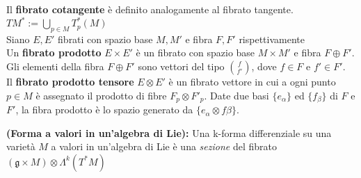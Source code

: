 Il \textbf{fibrato cotangente} è definito analogamente al fibrato tangente.
$ TM^* := \bigcup\limits_{p \in M} T^*_p(M) $\\

Siano $E,E'$ fibrati con spazio base $M,M'$ e fibra $F,F'$ rispettivamente\\

Un \textbf{fibrato prodotto} $E \times E'$ è un fibrato con spazio base
$M \times M'$ e fibra $F \oplus F'$. Gli elementi della fibra $F \oplus F'$ sono
vettori del tipo
${f}\choose{f'}$, dove  $f \in F$ e $f' \in F'$.\\

Il \textbf{fibrato prodotto tensore} $E \otimes E'$ è un fibrato vettore in cui
a ogni punto $p \in M$ è assegnato il prodotto di fibre $F_p \otimes F'_p$.
Date due basi $\{e_\alpha\}$ ed $\{f_\beta\}$ di $F$ e $F'$, la fibra prodotto
è lo spazio generato da $\{ e_\alpha \otimes f\beta \}$.

\begin{definition}\label{def:liealgebraform} \textbf{(Forma a valori in un'algebra di Lie):}
   Una k-forma differenziale su una varietà $M$ a valori in un'algebra di Lie è
   una \emph{sezione} del fibrato $(\mathfrak{g} \times M)\otimes \Lambda^k(T^*M)$
\end{definition}
